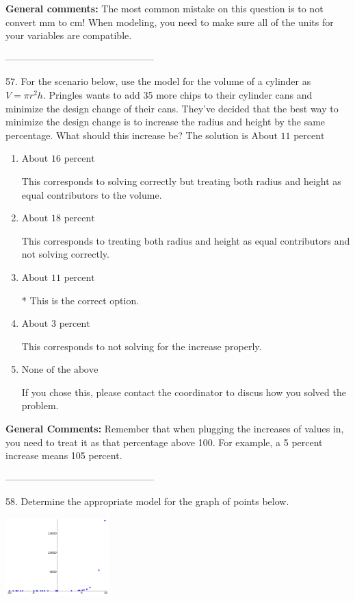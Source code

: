 \documentclass{extbook}[14pt]
\begin{document}
\textbf{General comments:} The most common mistake on this question is to not convert mm to cm! When modeling, you need to make sure all of the units for your variables are compatible.

-----------------------------------------------

57. For the scenario below, use the model for the volume of a cylinder as $V = \pi r^2 h$.
Pringles wants to add 35  more chips to their cylinder cans and minimize the design change of their cans. They've decided that the best way to minimize the design change is to increase the radius and height by the same percentage. What should this increase be? 
The solution is $ \text{About } 11 \text{ percent} $ 

\begin{enumerate}[label=\Alph*.] 
\item $ \text{About } 16 \text{ percent} $ 

 This corresponds to solving correctly but treating both radius and height as equal contributors to the volume. 
\item $ \text{About } 18 \text{ percent} $ 

 This corresponds to treating both radius and height as equal contributors and not solving correctly. 
\item $ \text{About } 11 \text{ percent} $ 

 * This is the correct option. 
\item $ \text{About } 3 \text{ percent} $ 

 This corresponds to not solving for the increase properly. 
\item $ \text{None of the above} $ 

 If you chose this, please contact the coordinator to discus how you solved the problem. 
\end{enumerate} 
 
\textbf{General Comments:} Remember that when plugging the increases of values in, you need to treat it as that percentage above 100. For example, a 5 percent increase means 105 percent.

-----------------------------------------------

58. Determine the appropriate model for the graph of points below.
\begin{center} \includegraphics[width=0.3\textwidth]{../Figures/identifyModelGraph12B.png} \end{center} 
\end{document}

